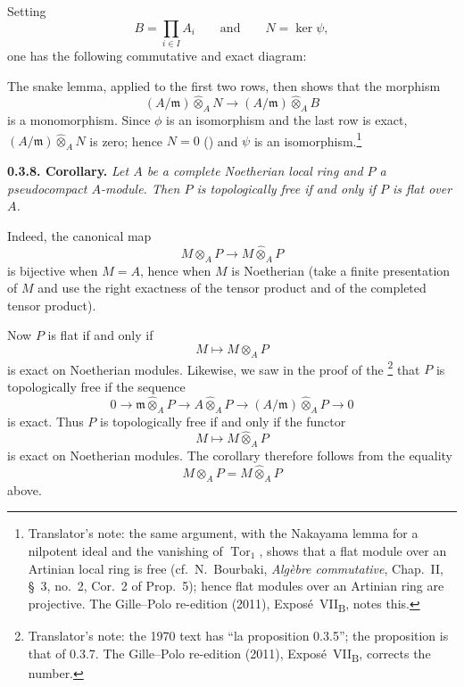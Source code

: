 Setting
\[
  B=\prod_{i\in I}A_i
  \qquad\text{and}\qquad
  N=\ker\psi,
\]
one has the following commutative and exact diagram:
\begin{center}
  \label{sga3:VIIB:0.3.7-nakayama-exact-diagram}
  
\end{center}
The snake lemma, applied to the first two rows, then shows that the
morphism
\[
  (A/\mathfrak m)\widehat{\otimes}_A N
  \longrightarrow
  (A/\mathfrak m)\widehat{\otimes}_A B
\]
is a monomorphism. Since \(\phi\) is an isomorphism and the last row is
exact, \((A/\mathfrak m)\widehat{\otimes}_A N\) is zero; hence \(N=0\)
() and \(\psi\) is an isomorphism.\footnote{Translator's note: the
same argument, with the Nakayama lemma for a nilpotent ideal and the vanishing of
\(\operatorname{Tor}_1\), shows that a flat module over an Artinian local ring is free (cf.\
N.~Bourbaki, \emph{Alg\`ebre commutative}, Chap.~II, \S~3, no.~2, Cor.~2 of Prop.~5); hence flat modules
over an Artinian ring are projective. The Gille--Polo re-edition (2011), Expos\'e~VII\textsubscript{B},
notes this.}

\medskip
\noindent\textbf{0.3.8. Corollary.}
\label{sga3:VIIB:0.3.8}
\textit{Let \(A\) be a complete Noetherian local ring and \(P\) a
pseudocompact \(A\)-module. Then \(P\) is topologically free if and
only if \(P\) is flat over \(A\).}

Indeed, the canonical map
\[
  M\otimes_A P\longrightarrow M\widehat{\otimes}_A P
\]
is bijective when \(M=A\), hence when \(M\) is Noetherian (take a
finite presentation of \(M\) and use the right exactness of the tensor
product and of the completed tensor product).

Now \(P\) is flat if and only if
\[
  M\longmapsto M\otimes_A P
\]
is exact on Noetherian modules. Likewise, we saw in the proof of the
\SGARefLink{sga3:VIIB:0.3.7}{proposition of 0.3.7}\footnote{Translator's note: the 1970 text has
``la proposition 0.3.5''; the proposition is that of 0.3.7. The Gille--Polo re-edition (2011),
Expos\'e~VII\textsubscript{B}, corrects the number.} that \(P\) is topologically free if the sequence
\[
  0\longrightarrow
  \mathfrak m\widehat{\otimes}_A P
  \longrightarrow
  A\widehat{\otimes}_A P
  \longrightarrow
  (A/\mathfrak m)\widehat{\otimes}_A P
  \longrightarrow0
\]
is exact. Thus \(P\) is topologically free if and only if the functor
\[
  M\longmapsto M\widehat{\otimes}_A P
\]
is exact on Noetherian modules. The corollary therefore follows from
the equality
\[
  M\otimes_A P=M\widehat{\otimes}_A P
\]
above.

